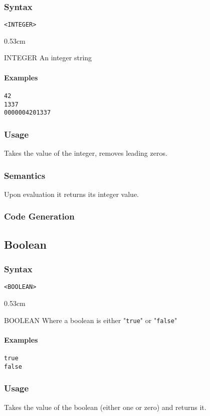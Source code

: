 \documentclass[twoside]{report}
\newenvironment{mycompactdesc}{\begin{adjustwidth}{0.53cm}{}\begin{compactdesc}}{\end{compactdesc}\end{adjustwidth}}
\begin{document}
\subsubsection*{Syntax}
\texttt{<INTEGER>}
\begin{mycompactdesc}
	\item[INTEGER] An integer string
\end{mycompactdesc}
\paragraph{Examples}
\begin{verbatim}
42
1337
0000004201337
\end{verbatim}
\subsubsection*{Usage}
Takes the value of the integer, removes leading zeros.
\subsubsection*{Semantics}
Upon evaluation it returns its integer value.
\subsubsection*{Code Generation}


\subsection{Boolean}
\label{def:boolean}
\subsubsection*{Syntax}
\texttt{<BOOLEAN>}
\begin{mycompactdesc}
	\item[BOOLEAN] Where a boolean is either "\texttt{true}" or "\texttt{false}"
\end{mycompactdesc}
\paragraph{Examples}
\begin{verbatim}
true
false
\end{verbatim}
\subsubsection*{Usage}
Takes the value of the boolean (either one or zero) and returns it.
\end{document}
